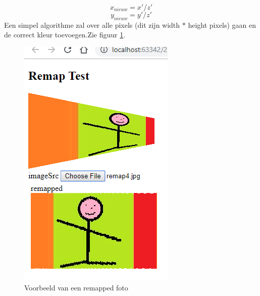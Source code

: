 $$x_{nieuw} = x'/z'$$  
$$y_{nieuw} = y'/z'$$
Een simpel algorithme zal over alle pixels (dit zijn width $ * $ height pixels) gaan en de correct kleur toevoegen.Zie figuur \ref{mappedfoto}.\cite{map}
\begin{figure}
\center
\includegraphics[scale=1]{remapEx}
\caption{Voorbeeld van een remapped foto}
\label{mappedfoto}
\end{figure}




